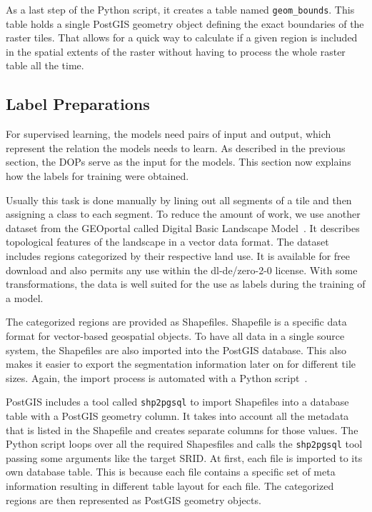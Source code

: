As a last step of the Python script, it creates a table named \texttt{geom\_bounds}. This table holds a single PostGIS geometry object defining the exact boundaries of the raster tiles. That allows for a quick way to calculate if a given region is included in the spatial extents of the raster without having to process the whole raster table all the time.

\subsection{Label Preparations}
\label{sec:prepare_labels}
For supervised learning, the models need pairs of input and output, which represent the relation the models needs to learn. As described in the previous section, the DOPs serve as the input for the models. This section now explains how the labels for training were obtained.

Usually this task is done manually by lining out all segments of a tile and then assigning a class to each segment. To reduce the amount of work, we use another dataset from the GEOportal called Digital Basic Landscape Model~\cite{base-dlm20}. It describes topological features of the landscape in a vector data format. The dataset includes regions categorized by their respective land use. It is available for free download and also permits any use within the dl-de/zero-2-0 license. With some transformations, the data is well suited for the use as labels during the training of a model.

The categorized regions are provided as Shapefiles. Shapefile is a specific data format for vector-based geospatial objects. To have all data in a single source system, the Shapefiles are also imported into the PostGIS database. This also makes it easier to export the segmentation information later on for different tile sizes. Again, the import process is automated with a Python script~\cite[\texttt{shp\_to\_geom.py}]{thesis-code20}.

PostGIS includes a tool called \texttt{shp2pgsql} to import Shapefiles into a database table with a PostGIS geometry column. It takes into account all the metadata that is listed in the Shapefile and creates separate columns for those values. The Python script loops over all the required Shapesfiles and calls the \texttt{shp2pgsql} tool passing some arguments like the target SRID. At first, each file is imported to its own database table. This is because each file contains a specific set of meta information resulting in different table layout for each file. The categorized regions are then represented as PostGIS geometry objects.

